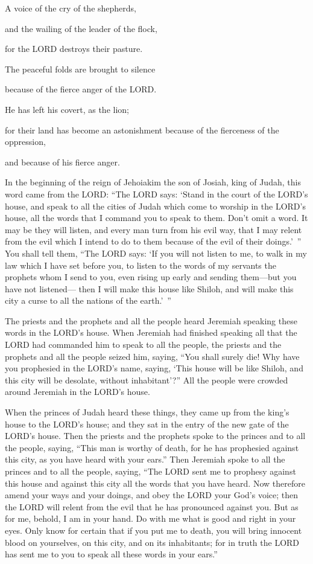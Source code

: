 \myverse{}A voice of the cry of the shepherds,

and the wailing of the leader of the flock,

for the LORD destroys their pasture.


\myverse{}The peaceful folds are brought to silence

because of the fierce anger of the LORD.


\myverse{}He has left his covert, as the lion;

for their land has become an astonishment because of the fierceness of the oppression,

and because of his fierce anger.


\mychapter{} \myverse*{}In the beginning of the reign of Jehoiakim the son of Josiah, king of Judah, this word came from the LORD: \myverse{}“The LORD says: ‘Stand in the court of the LORD’s house, and speak to all the cities of Judah which come to worship in the LORD’s house, all the words that I command you to speak to them. Don’t omit a word. \myverse{}It may be they will listen, and every man turn from his evil way, that I may relent from the evil which I intend to do to them because of the evil of their doings.’ ” \myverse{}You shall tell them, “The LORD says: ‘If you will not listen to me, to walk in my law which I have set before you, \myverse{}to listen to the words of my servants the prophets whom I send to you, even rising up early and sending them—but you have not listened— \myverse{}then I will make this house like Shiloh, and will make this city a curse to all the nations of the earth.’ ”


\myverse{}The priests and the prophets and all the people heard Jeremiah speaking these words in the LORD’s house. \myverse{}When Jeremiah had finished speaking all that the LORD had commanded him to speak to all the people, the priests and the prophets and all the people seized him, saying, “You shall surely die! \myverse{}Why have you prophesied in the LORD’s name, saying, ‘This house will be like Shiloh, and this city will be desolate, without inhabitant’?” All the people were crowded around Jeremiah in the LORD’s house.


\myverse{}When the princes of Judah heard these things, they came up from the king’s house to the LORD’s house; and they sat in the entry of the new gate of the LORD’s house. \myverse{}Then the priests and the prophets spoke to the princes and to all the people, saying, “This man is worthy of death, for he has prophesied against this city, as you have heard with your ears.” \myverse{}Then Jeremiah spoke to all the princes and to all the people, saying, “The LORD sent me to prophesy against this house and against this city all the words that you have heard. \myverse{}Now therefore amend your ways and your doings, and obey the LORD your God’s voice; then the LORD will relent from the evil that he has pronounced against you. \myverse{}But as for me, behold, I am in your hand. Do with me what is good and right in your eyes. \myverse{}Only know for certain that if you put me to death, you will bring innocent blood on yourselves, on this city, and on its inhabitants; for in truth the LORD has sent me to you to speak all these words in your ears.”


